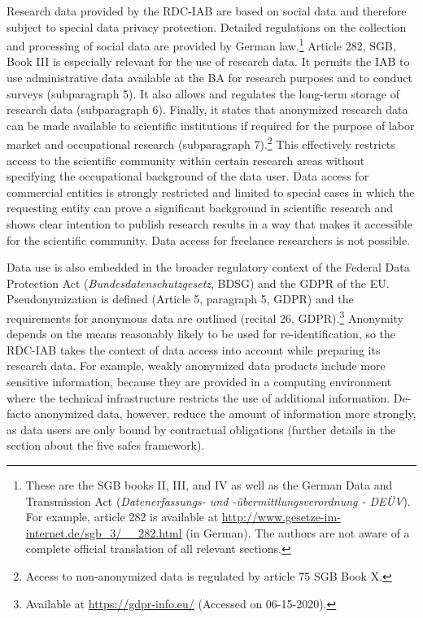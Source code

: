 Research data provided by the RDC-IAB are based on social data and therefore subject to special data privacy protection. Detailed regulations on the collection and processing of social data are provided by German law.\footnote{These are the SGB books II, III, and IV as well as the German Data and Transmission Act (\emph{Datenerfassungs- und -übermittlungsverordnung - DEÜV}). For example, article 282 is available at \url{http://www.gesetze-im-internet.de/sgb_3/__282.html} (in German). The authors are not aware of a complete official translation of all relevant sections.} Article 282, SGB, Book III is especially relevant for the use of research data. It permits the IAB to use administrative data available at the BA for research purposes and to conduct surveys (subparagraph 5). It also allows and regulates the long-term storage of research data (subparagraph 6). Finally, it states that anonymized research data can be made available to scientific institutions if required for the purpose of labor market and occupational research (subparagraph 7).\footnote{Access to non-anonymized data is regulated by article 75 SGB Book X.} This effectively restricts access to the scientific community within certain research areas without specifying the occupational background of the data user. Data access for commercial entities is strongly restricted and limited to special cases in which the requesting entity can prove a significant background in scientific research and shows clear intention to publish research results in a way that makes it accessible for the scientific community. Data access for freelance researchers is not possible.

Data use is also embedded in the broader regulatory context of the Federal Data Protection Act (\emph{Bundesdatenschutzgesetz}, BDSG) and the GDPR of the EU. Pseudonymization is defined (Article 5, paragraph 5, GDPR) and the requirements for anonymous data are outlined (recital 26, GDPR).\footnote{Available at \url{https://gdpr-info.eu/} (Accessed on 06-15-2020).} Anonymity depends on the means reasonably likely to be used for re-identification, so the RDC-IAB takes the context of data access into account while preparing its research data. For example, weakly anonymized data products include more sensitive information, because they are provided in a computing environment where the technical infrastructure restricts the use of additional information. De-facto anonymized data, however, reduce the amount of information more strongly, as data users are only bound by contractual obligations (further details in the section about the five safes framework).

